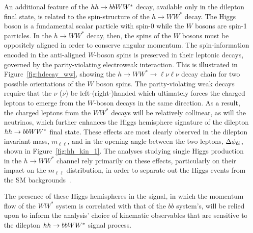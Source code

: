 An additional feature of the $hh \rightarrow bbWW^*$ decay, available only in the dilepton final state, is related to the spin-structure
of the $h \rightarrow WW^*$ decay.
The Higgs boson is a fundamental scalar particle with spin-0 while the $W$ bosons are spin-1 particles.
In the $h \rightarrow WW^*$ decay, then, the spins of the $W$ bosons must be oppositely aligned in order
to conserve angular momentum.
The spin-information encoded in the anti-aligned $W$-boson spins is preserved in their leptonic decays, governed by
the parity-violating electroweak interaction.
This is illustrated in Figure~\ref{fig:hdecay_ww}, showing the $h \rightarrow WW^* \rightarrow \ell \nu \ell \nu$
decay chain for two possible orientations of the $W$ boson spins.
The parity-violating weak decays require that the $\nu$ ($\bar{\nu}$) be left-(right-)handed which ultimately
forces the charged leptons to emerge from the $W$-boson decays in the same direction.
As a result, the charged leptons from the $WW^*$ decays will be relatively collinear,
as will the neutrinos, which further enhances the Higgs hemisphere signature of the dilepton $hh \rightarrow bbWW^*$ final state.
These effects are most clearly observed in the dilepton invariant mass, $m_{\ell \ell}$, and
in the opening angle between the two leptons, $\Delta \phi_{\ell\ell}$, shown in Figure~\ref{fig:hh_kin_1}.
The analyses studying single Higgs production in the $h \rightarrow WW^*$ channel rely primarily on these effects,
particularly on their impact on the $m_{\ell \ell}$ distribution, in order to separate out the
Higgs events from the SM backgrounds~\cite{Aaboud:2018jqu,Aad:2016lvc,ATLAS:2014aga}.


The presence of these Higgs hemispheres in the signal, in which the momentum flow of the $WW^*$ system
is correlated with that of the $bb$ system's, will be relied upon to inform the analysis' choice
of kinematic observables that are sensitive to the dilepton $hh \rightarrow bbWW^*$ signal process.

